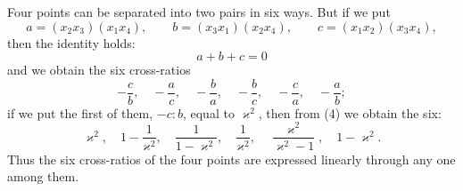 \documentclass[11pt]{article}
\begin{document}
Four points can be separated into two pairs in six ways. But if we put
\[
a=(x_2x_3)(x_1x_4),\qquad b=(x_3x_1)(x_2x_4),\qquad c=(x_1x_2)(x_3x_4),
\]
then the identity holds:
\begin{equation}
a+b+c=0
\tag{4}
\end{equation}
and we obtain the six cross-ratios
\begin{equation}
-\frac{c}{b},\quad -\frac{a}{c},\quad -\frac{b}{a},\quad -\frac{b}{c},\quad -\frac{c}{a},\quad -\frac{a}{b};
\tag{5}
\end{equation}
if we put the first of them, $-c:b$, equal to $\varkappa^2$, then from (4) we obtain the six:
\begin{equation}
\varkappa^2,\quad 1-\frac1{\varkappa^2},\quad \frac1{1-\varkappa^2},\quad \frac1{\varkappa^2},\quad \frac{\varkappa^2}{\varkappa^2-1},\quad 1-\varkappa^2.
\tag{6}
\end{equation}
Thus the six cross-ratios of the four points are expressed linearly through any one among them.
\end{document}
